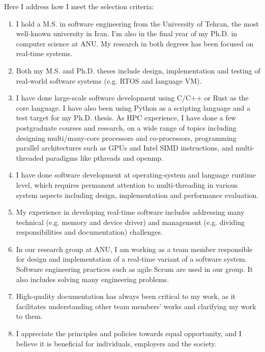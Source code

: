 \documentclass[11pt,a4paper,calibri]{moderncv}
\begin{document}
Here I address how I meet the selection criteria:
\vspace{0.2cm}
    \begin{enumerate}
        \item I hold a M.S. in software engineering from the University of Tehran, the most well-known university in Iran.
        I'm also in the final year of my Ph.D. in computer science at ANU.
        My research in both degrees has been focused on real-time systems.
        \item Both my M.S. and Ph.D. theses include design, implementation and testing of real-world software systems (e.g. RTOS and language VM).
        \item I have done large-scale software development using C/C++ or Rust as the core language. I have also been using Python as a scripting language and a test target for my Ph.D. thesis. As HPC experience, I have done a few postgraduate courses and research, on a wide range of topics including designing multi/many-core processors and co-processors, programming parallel architectures such as GPUs and Intel SIMD instructions, and multi-threaded paradigms like pthreads and openmp.
        \item I have done software development at operating-system and language runtime level, which requires permanent attention to multi-threading in various system aspects including design, implementation and performance evaluation.
        \item My experience in developing real-time software includes addressing many technical (e.g. memory and device driver) and management (e.g. dividing responsibilities and documentation) challenges.
        \item In our research group at ANU, I am working as a team member responsible for design and implementation of a real-time variant of a software system. Software engineering practices such as agile Scrum are used in our group. It also includes solving many engineering problems.
        \item High-quality documentation has always been critical to my work, as it facilitates understanding other team members' works and clarifying my work to them.
        \item I appreciate the principles and policies towards equal opportunity, and I believe it is beneficial for individuals, employers and the society.
    \end{enumerate}

\end{document}
